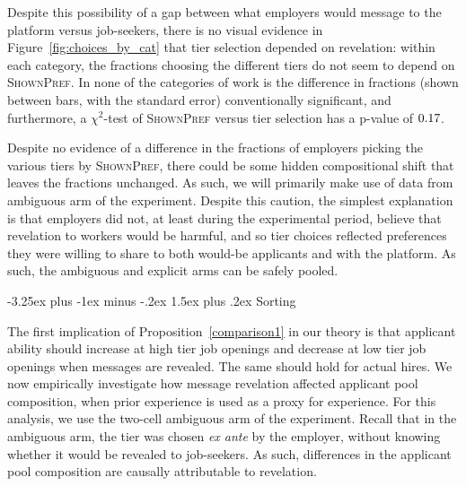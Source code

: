 \documentclass[12pt]{article}
\makeatletter
\renewcommand{\subsection}{%
  \@startsection{subsection}{2}{\z@}%
  {-3.25ex plus -1ex minus -.2ex}%
  {1.5ex plus .2ex}%
  {\normalfont\large\bfseries}%
}
\makeatother
\begin{document}
Despite this possibility of a gap between what employers would message to the platform versus job-seekers, there is no visual evidence in Figure~\ref{fig:choices_by_cat} that tier selection depended on revelation:
within each category, the fractions choosing the different tiers do not seem to depend on \textsc{ShownPref}.
In none of the categories of work is the difference in fractions (shown between bars, with the standard error) conventionally significant, and furthermore, a $\chi^2$-test of \textsc{ShownPref} versus tier selection has a p-value of $0.17{}$.

Despite no evidence of a difference in the fractions of employers picking the various tiers by \textsc{ShownPref}, there could be some hidden compositional shift that leaves the fractions unchanged.
As such, we will primarily make use of data from ambiguous arm of the experiment.  
Despite this caution, the simplest explanation is that employers did not, at least during the experimental period, believe that revelation to workers would be harmful, and so tier choices reflected preferences they were willing to share to both would-be applicants and with the platform.
As such, the ambiguous and explicit arms can be safely pooled. 

\subsection{Sorting} \label{sec:results_sorting} %

The first implication of Proposition~\ref{comparison1} in our theory is that applicant ability should increase at high tier job openings and decrease at low tier job openings when messages are revealed. The same should hold for actual hires. We now empirically investigate how message revelation affected applicant pool composition, when prior experience is used as a proxy for experience.
For this analysis, we use the two-cell ambiguous arm of the experiment.
Recall that in the ambiguous arm, the tier was chosen \emph{ex ante} by the employer, without knowing whether it would be revealed to job-seekers.
As such, differences in the applicant pool composition are causally attributable to revelation.
\end{document}
